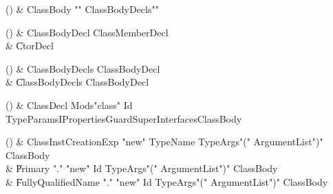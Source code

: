 \begin{bbgrammarappendix}

() & ClassBody \label{prod:ClassBody}  \: \xcd"{" ClassBodyDecls\opt \xcd"}"  \\


\end{bbgrammarappendix}

\begin{bbgrammarappendix}

() & ClassBodyDecl \label{prod:ClassBodyDecl}  \: ClassMemberDecl  \\

 &    \| CtorDecl \\

\end{bbgrammarappendix}

\begin{bbgrammarappendix}

() & ClassBodyDecls \label{prod:ClassBodyDecls}  \: ClassBodyDecl  \\

 &    \| ClassBodyDecls ClassBodyDecl \\

\end{bbgrammarappendix}

\begin{bbgrammarappendix}

() & ClassDecl \label{prod:ClassDecl}  \: Mods\opt \xcd"class" Id TypeParamsI\opt Properties\opt Guard\opt Super\opt Interfaces\opt ClassBody  \\


\end{bbgrammarappendix}

\begin{bbgrammarappendix}

() & ClassInstCreationExp \label{prod:ClassInstCreationExp}  \: \xcd"new" TypeName TypeArgs\opt \xcd"(" ArgumentList\opt \xcd")" ClassBody\opt  \\

 &    \| Primary \xcd"." \xcd"new" Id TypeArgs\opt \xcd"(" ArgumentList\opt \xcd")" ClassBody\opt \\
 &    \| FullyQualifiedName \xcd"." \xcd"new" Id TypeArgs\opt \xcd"(" ArgumentList\opt \xcd")" ClassBody\opt \\

\end{bbgrammarappendix}

